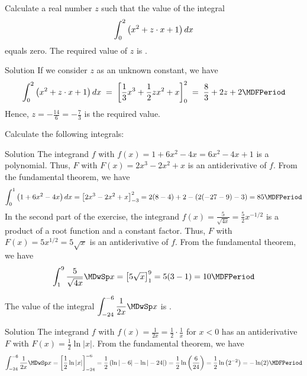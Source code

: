 \begin{MExercises}
\begin{MExercise}
Calculate a real number $z$ such that the value of the integral 
\[
\int_{0}^{2} \left(x^2 + z\cdot x+1\right) \MD x %
\]
equals zero. %
The required value of $z$ 
is .

\begin{MHint}{Solution}
If we consider $z$ as an unknown constant, we have
$$
\int_{0}^{2} \left(x^2 + z\cdot x+1\right) \MD x %
\;=\; \left[{\frac13x^3+\frac12 z x^2+x}\right]_0^2 %
\;=\; \frac83+2z+2 \MDFPeriod %
$$
Hence, $z=-\frac{14}{6} = -\frac{7}{3}$ is the required value.
\end{MHint}
\end{MExercise}

\begin{MExercise}
Calculate the following integrals:
\begin{MExerciseItems}
\item{}
\item{}
\end{MExerciseItems}

\begin{MHint}{Solution}
The integrand $f$ with $f(x) = 1 + 6 x^2 - 4x = 6 x^2 - 4 x + 1$ is a polynomial. 
Thus, $F$ with $F(x) = 2 x^3 - 2 x^2 + x$ is an antiderivative of $f$. From the 
fundamental theorem, we have
\[
 \int_{0}^{1} \left(1 + 6 x^2 - 4 x\right) \MD x %
 = \left[ 2 x^3 - 2 x^2 + x \right]_{-3}^{2} %
 = 2 (8 - 4) + 2 - (2 (-27 - 9) - 3) = 85 \MDFPeriod %
\]
In the second part of the exercise, the integrand $f(x) = \frac{5}{\sqrt{4 x}}= \frac{5}{2} x^{-1/2}$
is a product of a root function and a constant factor. Thus, $F$ with 
$F(x) = 5 x^{1/2} = 5 \sqrt{x}$ is an antiderivative of $f$. From the fundamental theorem,
we have
\[
 \int_{1}^{9} \frac{5}{\sqrt{4 x}} \MDwSp x %
 = \left[ 5 \sqrt{x} \right]_{1}^{9} %
 = 5 (3 - 1) = 10 \MDFPeriod %
\]
\end{MHint}
\end{MExercise}

\begin{MExercise}
The value of the integral
$\displaystyle \int_{-24}^{-6} \frac{1}{2 x} \MDwSp x$
is .

\begin{MHint}{Solution}
The integrand $f$ with $f(x) = \frac{1}{2 x} = \frac{1}{2} \cdot \frac{1}{x}$ 
for $x < 0$ has an antiderivative $F$ with $F(x) = \frac{1}{2} \ln|x|$.
From the fundamental theorem, we have
\[
 \int_{-24}^{-6} \frac{1}{2 x} \MDwSp x %
 = \left[ \frac{1}{2} \ln|x| \right]_{-24}^{-6} %
 = \frac{1}{2} \left(\ln|-6| - \ln|-24|\right) %
 = \frac{1}{2} \ln\left(\frac{6}{24}\right) %
 = \frac{1}{2} \ln\left(2^{-2}\right) %
 = -\ln(2) \MDFPeriod %
\]
\end{MHint}
\end{MExercise}


\end{MExercises}
